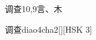 \begin{entry}{调查}{10,9}{⾔、⽊}
  \begin{phonetics}{调查}{diao4cha2}[][HSK 3]
  \end{phonetics}
\end{entry}
